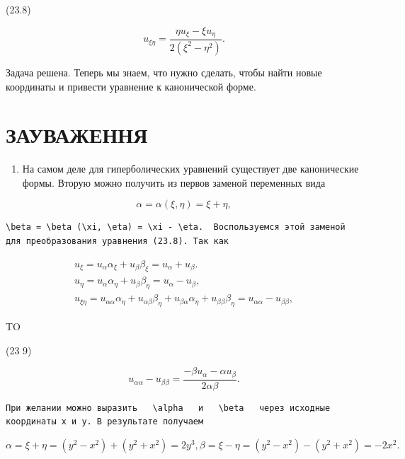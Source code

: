 \documentclass[
  ukrainian,
]{article}
\providecommand{\tightlist}{%
  \setlength{\itemsep}{0pt}\setlength{\parskip}{0pt}}
\begin{document}
(23.8)

\[
u_{\xi\eta} = \frac{\eta u_{\xi} - \xi u_{\eta}}{2(\xi^2 - \eta^2)}.
\]

Задача решена. Теперь мы знаем, что нужно сделать, чтобы найти новые
координаты и привести уравнение к канонической форме.

\section{ЗАУВАЖЕННЯ}\label{ux437ux430ux443ux432ux430ux436ux435ux43dux43dux44f}

\begin{enumerate}
\def\labelenumi{\arabic{enumi}.}
\tightlist
\item
  На самом деле для гиперболических уравнений существует две
  канонические формы. Вторую можно получить из первов заменой переменных
  вида
\end{enumerate}

\[
\alpha = \alpha (\xi, \eta) = \xi + \eta,
\]

\begin{verbatim}
\beta = \beta (\xi, \eta) = \xi - \eta.  Воспользуемся этой заменой для преобразования уравнения (23.8). Так как
\end{verbatim}

\[
\begin{array}{l} u_{\xi} = u_{\alpha}\alpha_{\xi} + u_{\beta}\beta_{\xi} = u_{\alpha} + u_{\beta}. \\ u_{\eta} = u_{\alpha}\alpha_{\eta} + u_{\beta}\beta_{\eta} = u_{\alpha} - u_{\beta}, \\ u_{\xi\eta} = u_{\alpha\alpha}\alpha_{\eta} + u_{\alpha\beta}\beta_{\eta} + u_{\beta\alpha}\alpha_{\eta} + u_{\beta\beta}\beta_{\eta} = u_{\alpha\alpha} - u_{\beta\beta}, \end{array}
\]

TO

(23 9)

\[
u_{\alpha\alpha} - u_{\beta\beta} = \frac{-\beta u_{\alpha} - \alpha u_{\beta}}{2\alpha\beta}.
\]

\begin{verbatim}
При желании можно выразить   \alpha   и   \beta   через исходные координаты x и y. В результате получаем
\end{verbatim}

\[
\alpha = \xi + \eta = (y^2 - x^2) + (y^2 + x^2) = 2y^3,
\beta = \xi - \eta = (y^2 - x^2) - (y^2 + x^2) = -2x^2.
\]
\end{document}
